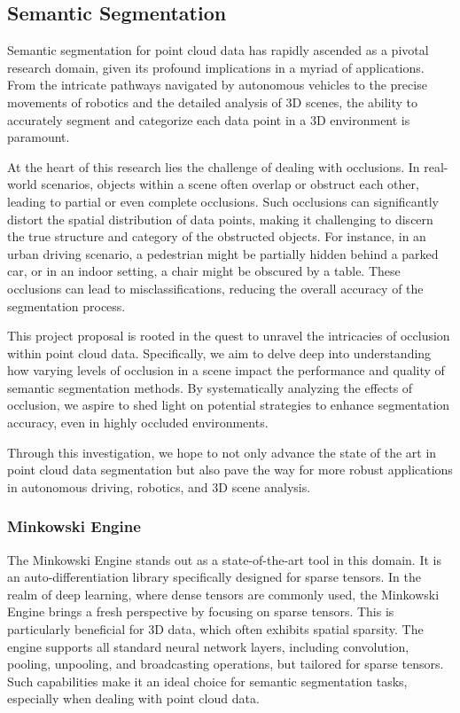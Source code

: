 \documentclass[11pt, a4paper,oneside,chapterprefix=false]{scrbook}
\begin{document}
\subsection{Semantic Segmentation}
Semantic segmentation for point cloud data has rapidly ascended as a pivotal research domain, given its profound implications in a myriad of applications. From the intricate pathways navigated by autonomous vehicles to the precise movements of robotics and the detailed analysis of 3D scenes, the ability to accurately segment and categorize each data point in a 3D environment is paramount.

At the heart of this research lies the challenge of dealing with occlusions. In real-world scenarios, objects within a scene often overlap or obstruct each other, leading to partial or even complete occlusions. Such occlusions can significantly distort the spatial distribution of data points, making it challenging to discern the true structure and category of the obstructed objects. For instance, in an urban driving scenario, a pedestrian might be partially hidden behind a parked car, or in an indoor setting, a chair might be obscured by a table. These occlusions can lead to misclassifications, reducing the overall accuracy of the segmentation process.

This project proposal is rooted in the quest to unravel the intricacies of occlusion within point cloud data. Specifically, we aim to delve deep into understanding how varying levels of occlusion in a scene impact the performance and quality of semantic segmentation methods. By systematically analyzing the effects of occlusion, we aspire to shed light on potential strategies to enhance segmentation accuracy, even in highly occluded environments.

Through this investigation, we hope to not only advance the state of the art in point cloud data segmentation but also pave the way for more robust applications in autonomous driving, robotics, and 3D scene analysis.

\subsubsection{Minkowski Engine}

The Minkowski Engine stands out as a state-of-the-art tool in this domain. It is an auto-differentiation library specifically designed for sparse tensors. In the realm of deep learning, where dense tensors are commonly used, the Minkowski Engine brings a fresh perspective by focusing on sparse tensors. This is particularly beneficial for 3D data, which often exhibits spatial sparsity. The engine supports all standard neural network layers, including convolution, pooling, unpooling, and broadcasting operations, but tailored for sparse tensors. Such capabilities make it an ideal choice for semantic segmentation tasks, especially when dealing with point cloud data.
\end{document}
